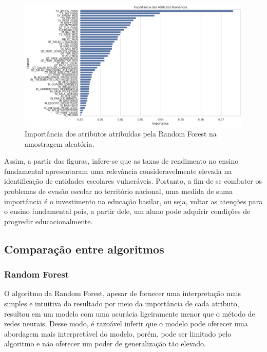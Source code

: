 \begin{figure}[H]
    \centering
    \includegraphics[scale = 0.4]{Graphics/Import-Ale.png}
    \caption{Importância dos atributos atribuídas pela Random Forest na amostragem aleatória.}
    \label{fig:enter-label}
\end{figure}

\par Assim, a partir das figuras, infere-se que as taxas de rendimento no ensino fundamental apresentaram uma relevância consideravelmente elevada na identificação de entidades escolares vulneráveis. Portanto, a fim de se combater os problemas de evasão escolar no território nacional, uma medida de suma importância é o investimento na educação basilar, ou seja, voltar as atenções para o ensino fundamental pois, a partir dele, um aluno pode adquirir condições de progredir educacionalmente.

\subsection{Comparação entre algoritmos}

\subsubsection{Random Forest}

\par O algoritmo da Random Forest, apesar de fornecer uma interpretação mais simples e intuitiva do resultado por meio da importância de cada atributo, resultou em um modelo com uma acurácia ligeiramente menor que o método de redes neurais. Desse modo, é razoável inferir que o modelo pode oferecer uma abordagem mais interpretável do modelo, porém, pode ser limitado pelo algoritmo e não oferecer um poder de generalização tão elevado.

